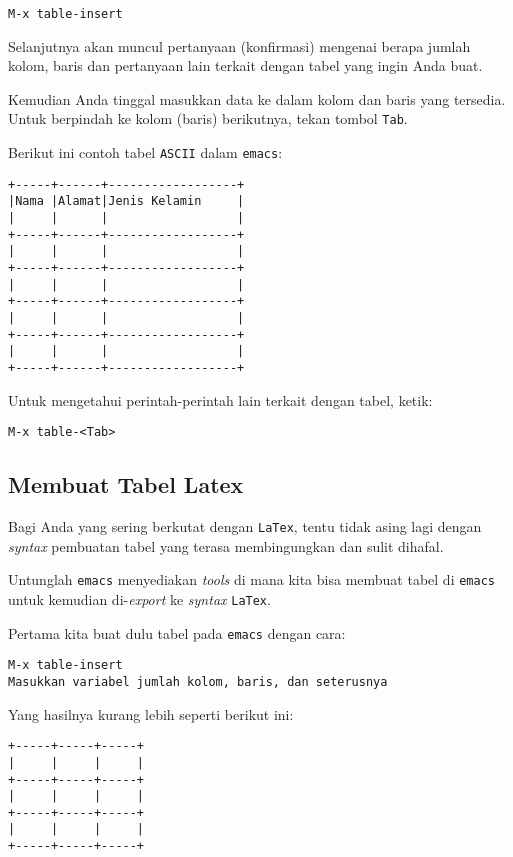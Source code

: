 \documentclass{article}
\begin{document}
\begin{verbatim}
M-x table-insert
\end{verbatim}

Selanjutnya akan muncul pertanyaan (konfirmasi) mengenai berapa jumlah kolom, 
baris dan pertanyaan lain terkait dengan tabel yang ingin Anda buat.

Kemudian Anda tinggal masukkan data ke dalam kolom dan baris yang tersedia.
Untuk berpindah ke kolom (baris) berikutnya, tekan tombol \verb=Tab=.

Berikut ini contoh tabel \verb=ASCII= dalam \verb=emacs=:

\begin{verbatim}
+-----+------+------------------+
|Nama |Alamat|Jenis Kelamin     |
|     |      |                  |
+-----+------+------------------+
|     |      |                  |
+-----+------+------------------+
|     |      |                  |
+-----+------+------------------+
|     |      |                  |
+-----+------+------------------+
|     |      |                  |
+-----+------+------------------+
\end{verbatim}

Untuk mengetahui perintah-perintah lain terkait dengan tabel, ketik:

\begin{verbatim}
M-x table-<Tab>
\end{verbatim}

\subsection{Membuat Tabel Latex}
Bagi Anda yang sering berkutat dengan \verb=LaTex=, tentu tidak asing lagi
dengan \emph{syntax} pembuatan tabel yang terasa membingungkan dan sulit
dihafal.

Untunglah \verb=emacs= menyediakan \emph{tools} di mana kita bisa membuat
tabel di \verb=emacs= untuk kemudian di-\emph{export} ke \emph{syntax}
\verb=LaTex=.

Pertama kita buat dulu tabel pada \verb=emacs= dengan cara:

\begin{verbatim}
M-x table-insert
Masukkan variabel jumlah kolom, baris, dan seterusnya
\end{verbatim}

Yang hasilnya kurang lebih seperti berikut ini:

\begin{verbatim}
+-----+-----+-----+
|     |     |     |
+-----+-----+-----+
|     |     |     |
+-----+-----+-----+
|     |     |     |
+-----+-----+-----+
\end{verbatim}
\end{document}
